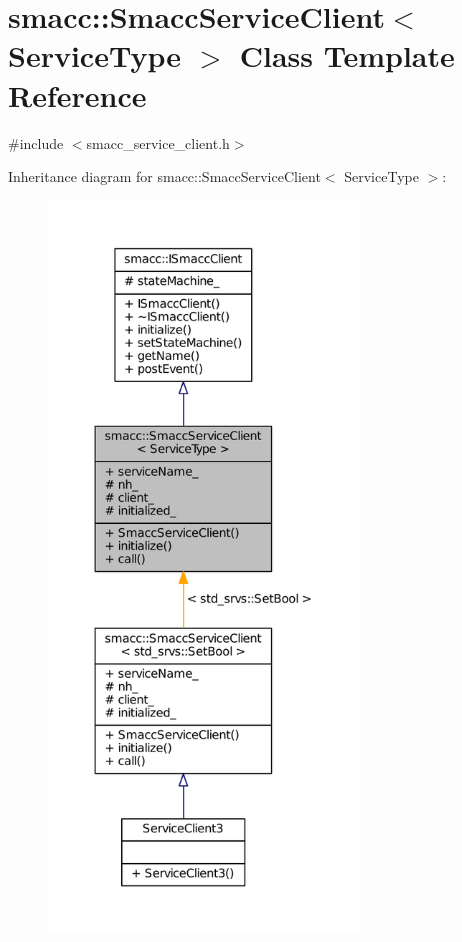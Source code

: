 \hypertarget{classsmacc_1_1SmaccServiceClient}{}\section{smacc\+:\+:Smacc\+Service\+Client$<$ Service\+Type $>$ Class Template Reference}
\label{classsmacc_1_1SmaccServiceClient}


{\ttfamily \#include $<$smacc\+\_\+service\+\_\+client.\+h$>$}



Inheritance diagram for smacc\+:\+:Smacc\+Service\+Client$<$ Service\+Type $>$\+:
\nopagebreak
\begin{figure}[H]
\begin{center}
\leavevmode
\includegraphics[height=550pt]{classsmacc_1_1SmaccServiceClient__inherit__graph}
\end{center}
\end{figure}



